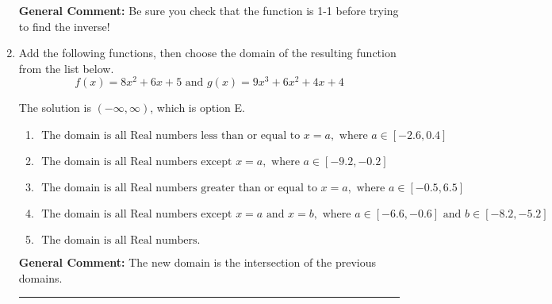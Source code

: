 \documentclass{extbook}[14pt]
\newcommand{\litem}[1]{\item #1

\rule{\textwidth}{0.4pt}}
\begin{document}
\begin{enumerate}
{\textbf{General Comment:} Be sure you check that the function is 1-1 before trying to find the inverse!
}
\litem{
Add the following functions, then choose the domain of the resulting function from the list below.
\[ f(x) = 8x^{2} +6 x + 5 \text{ and } g(x) = 9x^{3} +6 x^{2} +4 x + 4 \]

The solution is \( (-\infty, \infty) \), which is option E.\begin{enumerate}[label=\Alph*.]
\item \( \text{ The domain is all Real numbers less than or equal to } x = a, \text{ where } a \in [-2.6, 0.4] \)


\item \( \text{ The domain is all Real numbers except } x = a, \text{ where } a \in [-9.2, -0.2] \)


\item \( \text{ The domain is all Real numbers greater than or equal to } x = a, \text{ where } a \in [-0.5, 6.5] \)


\item \( \text{ The domain is all Real numbers except } x = a \text{ and } x = b, \text{ where } a \in [-6.6, -0.6] \text{ and } b \in [-8.2, -5.2] \)


\item \( \text{ The domain is all Real numbers. } \)


\end{enumerate}

\textbf{General Comment:} The new domain is the intersection of the previous domains.
}
\end{enumerate}
\end{document}
